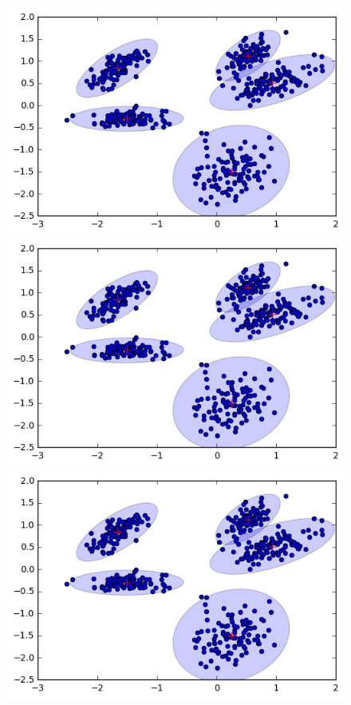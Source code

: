 \documentclass[a4paper,11pt]{article}
\begin{document}
\begin{figure}[htbp]
  \includegraphics[scale=0.17]{em4.png}
  \includegraphics[scale=0.17]{em5.png}
  \includegraphics[scale=0.17]{em6.png}

\end{figure}
\end{document}
